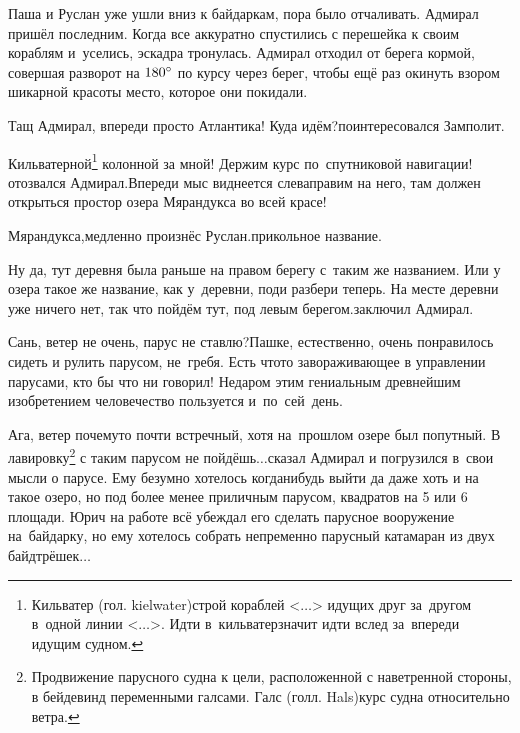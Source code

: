 Паша и Руслан уже ушли вниз к байдаркам, пора было отчаливать. Адмирал пришёл последним. Когда все аккуратно спустились с перешейка к своим кораблям и~уселись, эскадра тронулась. Адмирал отходил от берега кормой, совершая разворот на $180\degree$ по курсу через берег, чтобы ещё раз окинуть взором шикарной красоты место, которое они покидали. 

\diagdash Тащ Адмирал, впереди просто Атлантика! Куда идём?\mdash поинтересовался Замполит.

\renewcommand*{\thefootnote}{\fnsymbol{footnote}}
\setcounter{footnote}{0}
\diagdash Кильватерной\footnote{Кильватер (гол. kielwater)\mdash строй кораблей <$\dots$> идущих друг за~другом в~одной линии <$\dots$>. Идти в~кильватер\mdash значит идти вслед за~впереди идущим судном.} колонной за мной! Держим курс по~спутниковой навигации!\mdash отозвался Адмирал.\mdash Впереди мыс виднеется слева\mdash правим на него, там должен открыться простор озера Мярандукса во всей красе!

\diagdash Мярандукса,\mdash медленно произнёс Руслан.\mdash прикольное название.

\diagdash Ну да, тут деревня была раньше на правом берегу с~таким же названием. Или у озера такое же название, как у~деревни, поди разбери теперь. На месте деревни уже ничего нет, так что пойдём тут, под левым берегом.\mdash заключил Адмирал.

\diagdash Сань, ветер не очень, парус не ставлю?\mdash Пашке, естественно, очень понравилось сидеть и рулить парусом, не~гребя. Есть что\sdash то завораживающее в управлении парусами, кто бы что ни говорил! Недаром этим гениальным древнейшим изобретением человечество пользуется и~по~сей~день.

\renewcommand*{\thefootnote}{\fnsymbol{footnote}}
\setcounter{footnote}{0}
\diagdash Ага, ветер почему\sdash то почти встречный, хотя на~прошлом озере был попутный. В лавировку\footnote{Продвижение парусного судна к цели, расположенной с наветренной стороны, в бейдевинд переменными галсами. Галс (голл. Hals)\mdash курс судна относительно ветра.} с таким парусом не пойдёшь$\ldots$\mdash сказал Адмирал и погрузился в~свои мысли о парусе. Ему безумно хотелось когда\sdash нибудь выйти да даже хоть и на такое озеро, но под более менее приличным парусом, квадратов на 5 или 6 площади. Юрич на работе всё убеждал его сделать парусное вооружение на~байдарку, но ему хотелось собрать непременно парусный катамаран из двух байд\sdash трёшек$\ldots$


